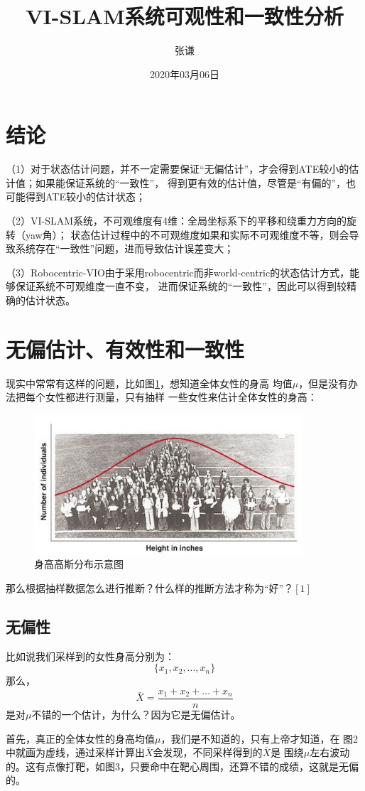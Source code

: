 \documentclass{article}
\title{VI-SLAM系统可观性和一致性分析}
\author{张谦}
\date{2020年03月06日}
\begin{document}
\maketitle
\tableofcontents
\newpage
\section{结论}
（1）对于状态估计问题，并不一定需要保证“无偏估计”，才会得到ATE较小的估计值；如果能保证系统的“一致性”，
得到更有效的估计值，尽管是“有偏的”，也可能得到ATE较小的估计状态；
\par
（2）VI-SLAM系统，不可观维度有4维：全局坐标系下的平移和绕重力方向的旋转（yaw角）；
状态估计过程中的不可观维度如果和实际不可观维度不等，则会导致系统存在“一致性”问题，进而导致估计误差变大；
\par
（3）Robocentric-VIO由于采用robocentric而非world-centric的状态估计方式，能够保证系统不可观维度一直不变，
进而保证系统的“一致性”，因此可以得到较精确的估计状态。


\section{无偏估计、有效性和一致性}
现实中常常有这样的问题，比如图\ref{figs:heightGaussian}，想知道全体女性的身高
均值$\mu$，但是没有办法把每个女性都进行测量，只有抽样
一些女性来估计全体女性的身高：
\begin{figure}[ht]
    \centering
    \includegraphics[width=10cm]{figure1.jpg}
    \caption{身高高斯分布示意图}
    \label{figs:heightGaussian}
\end{figure}

那么根据抽样数据怎么进行推断？什么样的推断方法才称为“好”？$\left[1\right]$
\subsection{无偏性}
比如说我们采样到的女性身高分别为：
\begin{equation}
\{x_1,x_2,\dots,x_n\}
\end{equation}
那么，
\begin{equation}
\bar{X}=\frac{x_1+x_2+\dots+x_n}{n}
\end{equation}
是对$\mu$不错的一个估计，为什么？因为它是无偏估计。\par
首先，真正的全体女性的身高均值$\mu$，我们是不知道的，只有上帝才知道，在
图2中就画为虚线，通过采样计算出$\bar{X}$会发现，不同采样得到的$\bar{X}$是
围绕$\mu$左右波动的。这有点像打靶，如图3，只要命中在靶心周围，还算不错的成绩，这就是无偏的。
\end{document}
